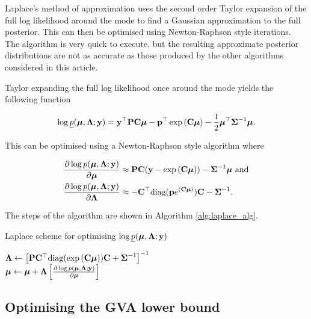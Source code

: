 \documentclass{article}[12pt]
\begin{document}
Laplace's method of approximation uses the second order Taylor expansion of the full log likelihood around the
mode to find a Gaussian approximation to the full posterior. This can then be optimised using Newton-Raphson
style iterations. The algorithm is very quick to execute, but the resulting approximate posterior
distributions are not as accurate as those produced by the other algorithms considered in this article.


Taylor expanding the full log likelihood once around the mode yields the following function

\begin{align*}
\log \underline{p}({\boldsymbol \mu}, {\boldsymbol \Lambda}; {\bf y}) = {\bf y}^\top{\bf P}{\bf C}{\boldsymbol\mu} - {\bf p}^\top\exp \left ({\bf C} {\boldsymbol \mu} \right ) - {\frac{1}{2}} {\boldsymbol \mu}^\top {\boldsymbol\Sigma}^{-1} {\boldsymbol \mu}.
\end{align*}

This can be optimised using a Newton-Raphson style algorithm where

\begin{align*}
\frac{\partial \log p({\boldsymbol \mu}, {\boldsymbol \Lambda}; {\bf y})}{\partial {\boldsymbol\mu}} &\approx {\bf P} {\bf C} ({\bf y} - \exp{({\bf C}{\boldsymbol\mu})}) - {\boldsymbol \Sigma}^{-1} {\boldsymbol \mu} \text{ and} \\
\frac{\partial \log p({\boldsymbol \mu}, {\boldsymbol \Lambda}; {\bf y})}{\partial {\boldsymbol\Lambda}} &\approx - {\bf C}^\top \text{diag}({\bf p} e^{({\bf C} {\boldsymbol \mu})}) {\bf C} - {\boldsymbol \Sigma}^{-1}.
\end{align*}

The steps of the algorithm are shown in Algorithm \ref{alg:laplace_alg}.

\begin{algorithm}
\caption{Laplace scheme for optimising $\log \underline{p}({\boldsymbol \mu}, {\boldsymbol \Lambda}; {\bf y})$}
\label{alg:laplace_alg}
\begin{algorithmic}
\STATE ${\boldsymbol \Lambda} \leftarrow \left [{\bf P} {\bf C}^\top \text{diag}(\exp{({\bf C}{\boldsymbol\mu})}) {\bf C} + {\boldsymbol \Sigma}^{-1} \right ]^{-1}$ \\ [1ex] 
\STATE ${\boldsymbol \mu} \leftarrow {\boldsymbol\mu} + {\boldsymbol \Lambda} \left [ \frac{\partial \log p({\boldsymbol \mu}, {\boldsymbol \Lambda}; {\bf y})}{\partial {\boldsymbol\mu}} \right ]$ \\ [1ex]
\ENDWHILE
\end{algorithmic}
\end{algorithm}

\subsection{Optimising the GVA lower bound}
\end{document}
